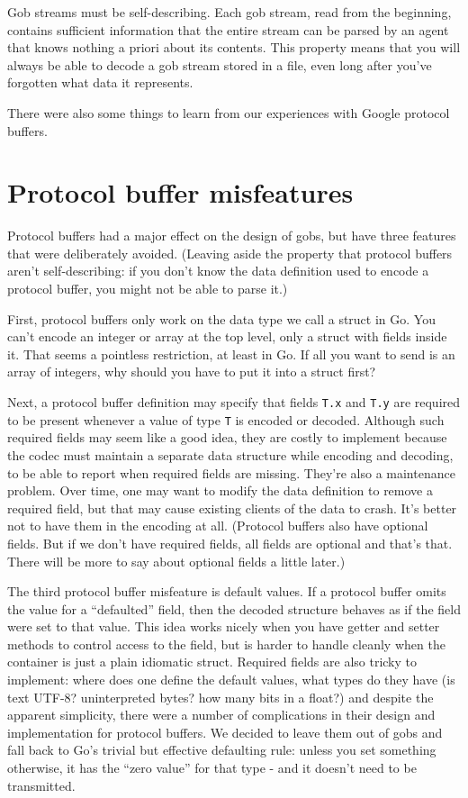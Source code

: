 Gob streams must be self-describing. Each gob stream, read from the
beginning, contains sufficient information that the entire stream can be
parsed by an agent that knows nothing a priori about its contents. This
property means that you will always be able to decode a gob stream
stored in a file, even long after you've forgotten what data it
represents.

There were also some things to learn from our experiences with Google
protocol buffers.

\section*{Protocol buffer misfeatures}

Protocol buffers had a major effect on the design of gobs, but have
three features that were deliberately avoided. (Leaving aside the
property that protocol buffers aren't self-describing: if you don't know
the data definition used to encode a protocol buffer, you might not be
able to parse it.)

First, protocol buffers only work on the data type we call a struct in
Go. You can't encode an integer or array at the top level, only a struct
with fields inside it. That seems a pointless restriction, at least in
Go. If all you want to send is an array of integers, why should you have
to put it into a struct first?

Next, a protocol buffer definition may specify that fields \texttt{T.x}
and \texttt{T.y} are required to be present whenever a value of type
\texttt{T} is encoded or decoded. Although such required fields may seem
like a good idea, they are costly to implement because the codec must
maintain a separate data structure while encoding and decoding, to be
able to report when required fields are missing. They're also a
maintenance problem. Over time, one may want to modify the data
definition to remove a required field, but that may cause existing
clients of the data to crash. It's better not to have them in the
encoding at all. (Protocol buffers also have optional fields. But if we
don't have required fields, all fields are optional and that's that.
There will be more to say about optional fields a little later.)

The third protocol buffer misfeature is default values. If a protocol
buffer omits the value for a ``defaulted'' field, then the decoded
structure behaves as if the field were set to that value. This idea
works nicely when you have getter and setter methods to control access
to the field, but is harder to handle cleanly when the container is just
a plain idiomatic struct. Required fields are also tricky to implement:
where does one define the default values, what types do they have (is
text UTF-8? uninterpreted bytes? how many bits in a float?) and despite
the apparent simplicity, there were a number of complications in their
design and implementation for protocol buffers. We decided to leave them
out of gobs and fall back to Go's trivial but effective defaulting rule:
unless you set something otherwise, it has the ``zero value'' for that
type - and it doesn't need to be transmitted.


